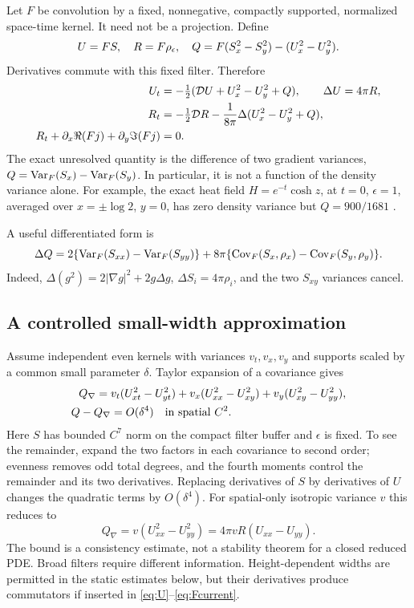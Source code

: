 Let $F$ be convolution by a fixed, nonnegative, compactly supported,
normalized space-time kernel. It need not be a projection.
Define
\begin{equation}
 U=FS,\quad R=F\rho_\epsilon,\quad
 Q=F(S_x^2-S_y^2)-(U_x^2-U_y^2).
 \label{eq:filtereddefs}
\end{equation}
Derivatives commute with this fixed filter. Therefore
\begin{align}
 U_t&=-\tfrac12(\mathcal D U+U_x^2-U_y^2+Q),\qquad \Delta U=4\pi R,
 \label{eq:U}\\
 R_t&=-\tfrac12\mathcal D R-\frac1{8\pi}\Delta(U_x^2-U_y^2+Q),
 \label{eq:R}\\
 R_t+\partial_x\Re(Fj)+\partial_y\Im(Fj)&=0. \label{eq:Fcurrent}
\end{align}
The exact unresolved quantity is the difference of two gradient
variances, $Q=\operatorname{Var}_F(S_x)-\operatorname{Var}_F(S_y)$.
In particular, it is not a function of the density variance alone.
For example, the exact heat field $H=e^{-t}\cosh z$, at $t=0$,
$\epsilon=1$, averaged over $x=\pm\log2$, $y=0$, has zero density
variance but $Q=900/1681$ \cite{n02}.

A useful differentiated form is
\begin{equation}
 \Delta Q=2\{\operatorname{Var}_F(S_{xx})-\operatorname{Var}_F(S_{yy})\}
 +8\pi\{\operatorname{Cov}_F(S_x,\rho_x)-\operatorname{Cov}_F(S_y,\rho_y)\}.
 \label{eq:lapQ}
\end{equation}
Indeed, $\Delta(g^2)=2|\nabla g|^2+2g\Delta g$,
$\Delta S_i=4\pi\rho_i$, and the two $S_{xy}$ variances cancel.

\subsection{A controlled small-width approximation}
Assume independent even kernels with variances $v_t,v_x,v_y$ and
supports scaled by a common small parameter $\delta$.
Taylor expansion of a covariance gives
\begin{align}
 Q_\nabla={}&v_t(U_{xt}^2-U_{yt}^2)
 +v_x(U_{xx}^2-U_{xy}^2)
 +v_y(U_{xy}^2-U_{yy}^2), \label{eq:gradient}\\
 Q-Q_\nabla&=O(\delta^4)\quad\hbox{in spatial }C^2.
 \label{eq:gradienterror}
\end{align}
Here $S$ has bounded $C^7$ norm on the compact filter buffer and
$\epsilon$ is fixed. To see the remainder, expand the two factors in
each covariance to second order; evenness removes odd total degrees,
and the fourth moments control the remainder and its two derivatives.
Replacing derivatives of $S$ by derivatives of $U$ changes the
quadratic terms by $O(\delta^4)$.
For spatial-only isotropic variance $v$ this reduces to
\begin{equation}
 Q_\nabla=v(U_{xx}^2-U_{yy}^2)
          =4\pi v R(U_{xx}-U_{yy}).
 \label{eq:isotropic}
\end{equation}
The bound is a consistency estimate, not a stability theorem for a
closed reduced PDE. Broad filters require different information.
Height-dependent widths are permitted in the static estimates below,
but their derivatives produce commutators if inserted in
\eqref{eq:U}--\eqref{eq:Fcurrent}.

